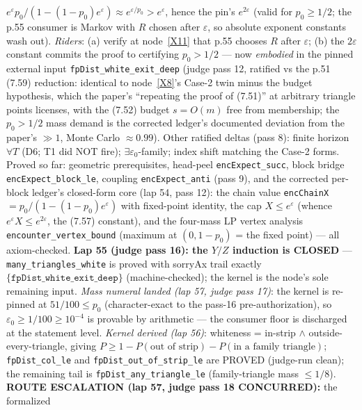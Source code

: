 \begin{lemma}
\(e^{\varepsilon}p_0/(1-(1-p_0)e^{\varepsilon}) \approx e^{\varepsilon/p_0} > e^{\varepsilon}\),
hence the pin's \(e^{2\varepsilon}\) (valid for \(p_0 \ge 1/2\); the p.55 consumer is Markov
with \(R\) chosen after \(\varepsilon\), so absolute exponent constants wash out).
\emph{Riders}: (a) verify at node~\ref{X11} that p.55 chooses \(R\) after \(\varepsilon\);
(b) the \(2\varepsilon\) constant commits the proof to certifying \(p_0 > 1/2\) --- now
\emph{embodied} in the pinned external input \texttt{fpDist\_white\_exit\_deep} (judge pass
12, ratified vs the p.51 (7.59) reduction: identical to node~\ref{X8}'s Case-2 twin minus
the budget hypothesis, which the paper's ``repeating the proof of (7.51)'' at arbitrary
triangle points licenses, with the (7.52) budget \(s = O(m)\) free from membership; the
\(p_0 > 1/2\) mass demand is the corrected ledger's documented deviation from the paper's
\(\gg 1\), Monte Carlo \(\approx 0.99\)).
Other ratified deltas (pass 8): finite horizon \(\forall T\) (D6; T1 did NOT fire);
\(\exists\varepsilon_0\)-family; index shift matching the Case-2 forms.  Proved so far:
geometric prerequisites, head-peel \texttt{encExpect\_succ}, block bridge
\texttt{encExpect\_block\_le}, coupling \texttt{encExpect\_anti} (pass 9), and the
corrected per-block ledger's closed-form core (lap 54, pass 12): the chain value
\texttt{encChainX} \(= p_0/(1-(1-p_0)e^{\varepsilon})\) with fixed-point identity, the cap
\(X \le e^{\varepsilon}\) (whence \(e^{\varepsilon}X \le e^{2\varepsilon}\), the (7.57)
constant), and the four-mass LP vertex analysis \texttt{encounter\_vertex\_bound} (maximum
at \((0, 1-p_0)\) = the fixed point) --- all axiom-checked.  \textbf{Lap 55 (judge pass
16): the \(Y/Z\) induction is CLOSED} --- \texttt{many\_triangles\_white} is proved with
sorryAx trail exactly \(\{\texttt{fpDist\_white\_exit\_deep}\}\) (machine-checked); the
kernel is the node's sole remaining input.  \emph{Mass numeral landed (lap 57, judge
pass 17)}: the kernel is re-pinned at \(51/100 \le p_0\) (character-exact to the pass-16
pre-authorization), so \(\varepsilon_0 \ge 1/100 \ge 10^{-4}\) is provable by arithmetic
--- the consumer floor is discharged at the statement level.  \emph{Kernel derived (lap
56)}: whiteness = in-strip \(\wedge\) outside-every-triangle, giving
\(P \ge 1 - P(\text{out of strip}) - P(\text{in a family triangle})\);
\texttt{fpDist\_col\_le} and \texttt{fpDist\_out\_of\_strip\_le} are PROVED (judge-run
clean); the remaining tail is \texttt{fpDist\_any\_triangle\_le} (family-triangle mass
\(\le 1/8\)).
\textbf{ROUTE ESCALATION (lap 57, judge pass 18 CONCURRED):} the formalized

\end{lemma}
